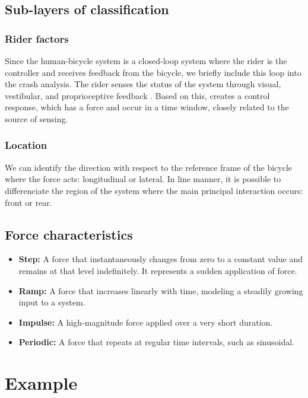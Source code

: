 \documentclass{article}
\begin{document}
\subsection{Sub-layers of classification}

\subsubsection{Rider factors}

Since the human-bicycle system is a closed-loop system where the rider is the controller and receives feedback from the bicycle, we briefly include this loop into the crash analysis.
%
The rider senses the status of the system through visual, vestibular, and proprioceptive feedback \cite{Moo12}.
%
Based on this, creates a control response, which has a force and occur in a time window, closely related to the source of sensing.

\subsubsection{Location}

We can identify the direction with respect to the reference frame of the bicycle where the force acts: longitudinal or lateral.
%
In line manner, it is possible to differenciate the region of the system where the main principal interaction occurs: front or rear.

\subsection{Force characteristics}

\begin{itemize}
    \item \textbf{Step:} A force that instantaneously changes from zero to a constant value and remains at that level indefinitely. It represents a sudden application of force.
    \item \textbf{Ramp:} A force that increases linearly with time, modeling a steadily growing input to a system.
    \item \textbf{Impulse:} A high-magnitude force applied over a very short duration.
    \item \textbf{Periodic:} A force that repeats at regular time intervals, such as sinusoidal.
\end{itemize}


\section{Example}
\end{document}

